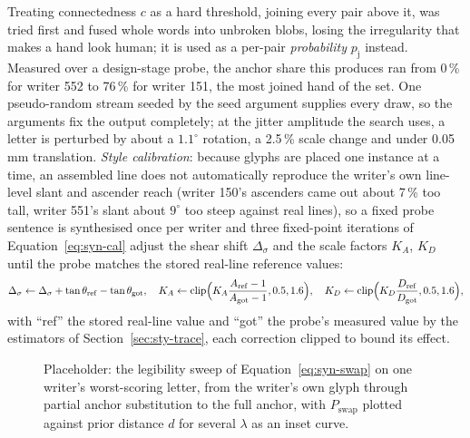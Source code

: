 Treating connectedness $c$ as a hard threshold, joining every pair above it, was tried first and fused whole words into unbroken blobs, losing the irregularity that makes a hand look human; it is used as a per-pair \emph{probability} $p_{\mathrm j}$ instead. Measured over a design-stage probe, the anchor share this produces ran from 0\,\% for writer 552 to 76\,\% for writer 151, the most joined hand of the set. One pseudo-random stream seeded by the seed argument supplies every draw, so the arguments fix the output completely; at the jitter amplitude the search uses, a letter is perturbed by about a $1.1^\circ$ rotation, a 2.5\,\% scale change and under 0.05\,mm translation. \emph{Style calibration}: because glyphs are placed one instance at a time, an assembled line does not automatically reproduce the writer's own line-level slant and ascender reach (writer 150's ascenders came out about 7\,\% too tall, writer 551's slant about $9^\circ$ too steep against real lines), so a fixed probe sentence is synthesised once per writer and three fixed-point iterations of Equation~\ref{eq:syn-cal} adjust the shear shift $\Delta_\sigma$ and the scale factors $K_A$, $K_D$ until the probe matches the stored real-line reference values:
\begin{equation}
\Delta_\sigma\leftarrow\Delta_\sigma+\tan\theta_{\mathrm{ref}}-\tan\theta_{\mathrm{got}},\quad K_A\leftarrow\operatorname{clip}\Bigl(K_A\frac{A_{\mathrm{ref}}-1}{A_{\mathrm{got}}-1},0.5,1.6\Bigr),\quad K_D\leftarrow\operatorname{clip}\Bigl(K_D\frac{D_{\mathrm{ref}}}{D_{\mathrm{got}}},0.5,1.6\Bigr),
\label{eq:syn-cal}
\end{equation}
with ``ref'' the stored real-line value and ``got'' the probe's measured value by the estimators of Section~\ref{sec:sty-trace}, each correction clipped to bound its effect.

\begin{figure}[htb]
\centering
{}
\captionsetup{singlelinecheck=false,justification=justified}
\caption{Placeholder: the legibility sweep of Equation~\ref{eq:syn-swap} on one writer's worst-scoring letter, from the writer's own glyph through partial anchor substitution to the full anchor, with $P_{\mathrm{swap}}$ plotted against prior distance $d$ for several $\lambda$ as an inset curve.}
\label{fig:syn-swap-fig}
\end{figure}

